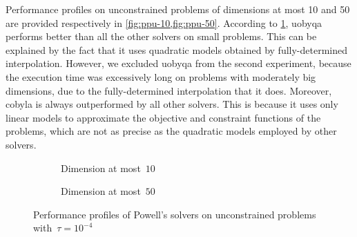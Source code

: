 Performance profiles on unconstrained problems of dimensions at most \num{10} and \num{50} are provided respectively in \cref{fig:ppu-10,fig:ppu-50}.
According to \cref{fig:ppu-10}, \gls{uobyqa} performs better than all the other solvers on small problems.
This can be explained by the fact that it uses quadratic models obtained by fully-determined interpolation.
However, we excluded \gls{uobyqa} from the second experiment, because the execution time was excessively long on problems with moderately big dimensions, due to the fully-determined interpolation that it does.
Moreover, \gls{cobyla} is always outperformed by all other solvers.
This is because it uses only linear models to approximate the objective and constraint functions of the problems, which are not as precise as the quadratic models employed by other solvers.

\begin{figure}[ht]
    \begin{subfigure}[b]{0.49\textwidth}
        \centering
        \caption{Dimension at most~$10$}
        \label{fig:ppu-10}
    \end{subfigure}
    \hfill
    \begin{subfigure}[b]{0.49\textwidth}
        \centering
        \caption{Dimension at most~$50$}
        \label{fig:ppu-50}
    \end{subfigure}
    \caption[Performance profiles of Powell's  solvers]{Performance profiles of Powell's  solvers on unconstrained problems with~$\tau = 10^{-4}$}
\end{figure}


